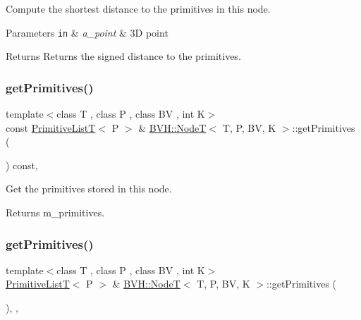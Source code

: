 Compute the shortest distance to the primitives in this node. 


\begin{DoxyParams}[1]{Parameters}
\mbox{\tt in}  & {\em a\+\_\+point} & 3D point \\
\hline
\end{DoxyParams}
\begin{DoxyReturn}{Returns}
Returns the signed distance to the primitives. 
\end{DoxyReturn}
\mbox{\label{classBVH_1_1NodeT_a2e0c1e030162a2dc049acb4debd4d9f2}} 
\subsubsection{\texorpdfstring{get\+Primitives()}{getPrimitives()}\hspace{0.1cm}{\footnotesize\ttfamily [1/2]}}
{\footnotesize\ttfamily template$<$class T , class P , class BV , int K$>$ \\
const \hyperlink{namespaceBVH_aa1e753bda451b85cd5b948722a2ad7c7}{Primitive\+ListT}$<$ P $>$ \& \hyperlink{classBVH_1_1NodeT}{B\+V\+H\+::\+NodeT}$<$ T, P, BV, K $>$\+::get\+Primitives (\begin{DoxyParamCaption}{ }\end{DoxyParamCaption}) const\hspace{0.3cm}{\ttfamily [inline]}, {\ttfamily [noexcept]}}



Get the primitives stored in this node. 

\begin{DoxyReturn}{Returns}
m\+\_\+primitives. 
\end{DoxyReturn}
\mbox{\label{classBVH_1_1NodeT_adce9d9c6bd4ab3d613bef232353774f3}} 
\subsubsection{\texorpdfstring{get\+Primitives()}{getPrimitives()}\hspace{0.1cm}{\footnotesize\ttfamily [2/2]}}
{\footnotesize\ttfamily template$<$class T , class P , class BV , int K$>$ \\
\hyperlink{namespaceBVH_aa1e753bda451b85cd5b948722a2ad7c7}{Primitive\+ListT}$<$ P $>$ \& \hyperlink{classBVH_1_1NodeT}{B\+V\+H\+::\+NodeT}$<$ T, P, BV, K $>$\+::get\+Primitives (\begin{DoxyParamCaption}{ }\end{DoxyParamCaption})\hspace{0.3cm}{\ttfamily [inline]}, {\ttfamily [protected]}, {\ttfamily [noexcept]}}



